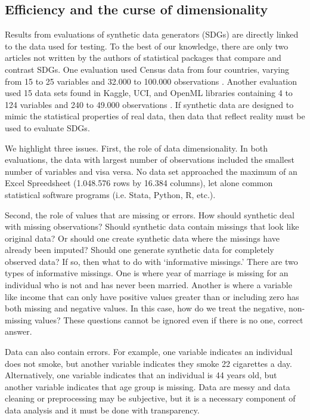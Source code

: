 \documentclass[runningheads]{llncs}
\begin{document}
\subsection{Efficiency and the curse of dimensionality}

Results from evaluations of synthetic data generators (SDGs) are directly linked to the data used for testing.  To the best of our knowledge, there are only two articles not written by the authors of statistical packages that compare and contrast SDGs.  One evaluation used Census data from four countries, varying from 15 to 25 variables and 32.000 to 100.000 observations \cite{little2022comparing}.  Another evaluation used 15 data sets found in Kaggle, UCI, and OpenML libraries containing 4 to 124 variables and 240 to 49.000 observations \cite{dankar2021fake}.  If synthetic data are designed to mimic the statistical properties of real data, then data that reflect reality must be used to evaluate SDGs.  

We highlight three issues.  First, the role of data dimensionality.  In both evaluations, the data with largest number of observations included the smallest number of variables and visa versa.  No data set approached the maximum of an Excel Spreedsheet (1.048.576 rows by 16.384 columns), let alone common statistical software programs (i.e. Stata, Python, R, etc.).  

Second, the role of values that are missing or errors.  How should synthetic deal with missing observations?  Should synthetic data contain missings that look like original data?  Or should one create synthetic data where the missings have already been imputed?  Should one generate synthetic data for completely observed data?  If so, then what to do with `informative missings.'  There are two types of informative missings.  One is where year of marriage is missing for an individual who is not and has never been married.  Another is where a variable like income that can only have positive values greater than or including zero has both missing and negative values.  In this case, how do we treat the negative, non-missing values?  These questions cannot be ignored even if there is no one, correct answer.

Data can also contain errors.  For example, one variable indicates an individual does not smoke, but another variable indicates they smoke 22 cigarettes a day.  Alternatively, one variable indicates that an individual is 44 years old, but another variable indicates that age group is missing.  Data are messy and data cleaning or preprocessing may be subjective, but it is a necessary component of data analysis and it must be done with transparency.
\end{document}
